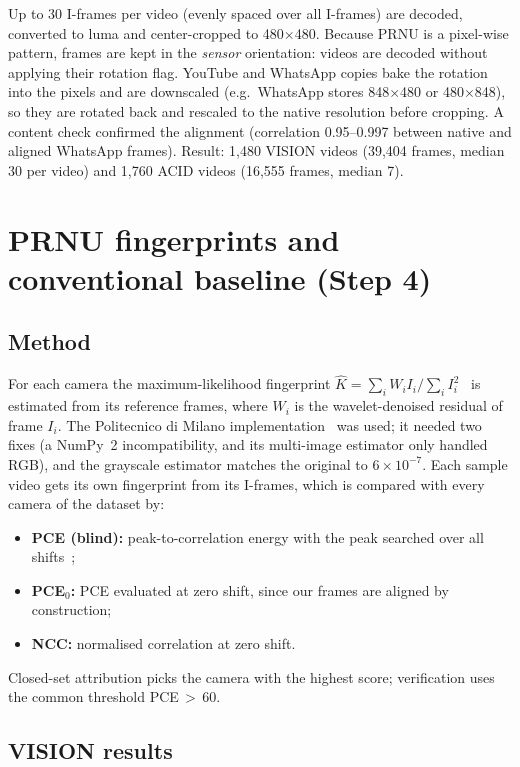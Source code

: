 \documentclass[11pt,a4paper]{article}
\begin{document}
Up to 30 I-frames per video (evenly spaced over all I-frames) are decoded, converted to luma and
center-cropped to 480$\times$480. Because PRNU is a pixel-wise pattern, frames are kept in the
\emph{sensor} orientation: videos are decoded without applying their rotation flag. YouTube and
WhatsApp copies bake the rotation into the pixels and are downscaled (e.g.\ WhatsApp stores 848$\times$480
or 480$\times$848), so they are rotated back and rescaled to the native resolution before cropping.
A content check confirmed the alignment (correlation 0.95--0.997 between native and aligned
WhatsApp frames). Result: 1{,}480 VISION videos (39{,}404 frames, median 30 per video) and 1{,}760 ACID
videos (16{,}555 frames, median 7).

\section{PRNU fingerprints and conventional baseline (Step 4)}

\subsection{Method}
For each camera the maximum-likelihood fingerprint
$\hat K = \sum_i W_i I_i / \sum_i I_i^2$~\cite{chen2008} is estimated from its reference frames,
where $W_i$ is the wavelet-denoised residual of frame $I_i$. The Politecnico di Milano
implementation~\cite{prnupython} was used; it needed two fixes (a NumPy~2 incompatibility, and
its multi-image estimator only handled RGB), and the grayscale estimator matches the original to
$6\times10^{-7}$. Each sample video gets its own fingerprint from its I-frames, which is compared
with every camera of the dataset by:
\begin{itemize}
  \item \textbf{PCE (blind):} peak-to-correlation energy with the peak searched over all shifts~\cite{lukas2006};
  \item \textbf{PCE$_0$:} PCE evaluated at zero shift, since our frames are aligned by construction;
  \item \textbf{NCC:} normalised correlation at zero shift.
\end{itemize}
Closed-set attribution picks the camera with the highest score; verification uses the common
threshold PCE\,$>$\,60.

\subsection{VISION results}
\end{document}
